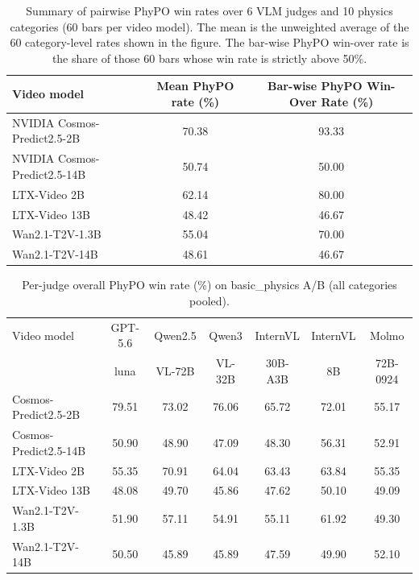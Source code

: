 \begin{table}[t]
\centering
\caption{Summary of pairwise PhyPO win rates over 6 VLM judges and 10 physics categories (60 bars per video model).
The mean is the unweighted average of the 60 category-level rates shown in the figure.
The bar-wise PhyPO win-over rate is the share of those 60 bars whose win rate is strictly above 50\%.}
\label{tab:phypo-vlm-summary}
\begin{tabular}{lcc}
\toprule
Video model &
Mean PhyPO rate (\%) &
Bar-wise PhyPO Win-Over Rate (\%) \\
\midrule
NVIDIA Cosmos-Predict2.5-2B & 70.38 & 93.33 \\
NVIDIA Cosmos-Predict2.5-14B & 50.74 & 50.00 \\
LTX-Video 2B & 62.14 & 80.00 \\
LTX-Video 13B & 48.42 & 46.67 \\
Wan2.1-T2V-1.3B & 55.04 & 70.00 \\
Wan2.1-T2V-14B & 48.61 & 46.67 \\
\bottomrule
\end{tabular}
\end{table}

\begin{table}[t]
\centering
\caption{Per-judge overall PhyPO win rate (\%) on basic\_physics A/B (all categories pooled).}
\label{tab:phypo-vlm-per-judge}
\setlength{\tabcolsep}{4pt}
\begin{tabular}{lcccccc}
\toprule
Video model &
GPT-5.6 &
Qwen2.5 &
Qwen3 &
InternVL &
InternVL &
Molmo \\
 &
luna &
VL-72B &
VL-32B &
30B-A3B &
8B &
72B-0924 \\
\midrule
Cosmos-Predict2.5-2B & 79.51 & 73.02 & 76.06 & 65.72 & 72.01 & 55.17 \\
Cosmos-Predict2.5-14B & 50.90 & 48.90 & 47.09 & 48.30 & 56.31 & 52.91 \\
LTX-Video 2B & 55.35 & 70.91 & 64.04 & 63.43 & 63.84 & 55.35 \\
LTX-Video 13B & 48.08 & 49.70 & 45.86 & 47.62 & 50.10 & 49.09 \\
Wan2.1-T2V-1.3B & 51.90 & 57.11 & 54.91 & 55.11 & 61.92 & 49.30 \\
Wan2.1-T2V-14B & 50.50 & 45.89 & 45.89 & 47.59 & 49.90 & 52.10 \\
\bottomrule
\end{tabular}
\end{table}
